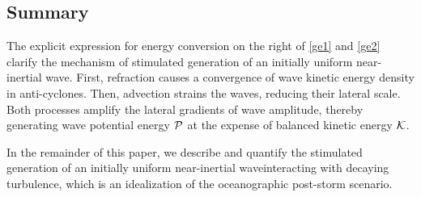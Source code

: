 \documentclass{jfm}
\newcommand{\NIW}{near-inertial wave}
\begin{document}
\subsection{Summary}

The explicit expression for energy conversion on the right of \eqref{ge1} and \eqref{ge2} clarify the mechanism of stimulated generation of an initially uniform \NIW. First, refraction causes a convergence of wave
kinetic energy density in anti-cyclones. Then, advection strains the waves, reducing their lateral scale. Both
processes amplify the lateral gradients of wave amplitude, thereby generating wave potential energy $\mathcal{P}$ at the expense of balanced kinetic energy $\mathcal{K}$.

In the remainder of this paper, we describe and quantify the stimulated generation of an initially uniform \NIW interacting with decaying turbulence, which is an idealization of the oceanographic post-storm scenario.
\end{document}
